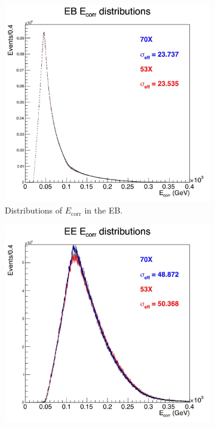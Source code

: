 \documentclass[10pt]{article}
\begin{document}
\begin{figure}[h!]
        \centering
        \begin{subfigure}[b]{0.4\textwidth}
                \includegraphics[width=\textwidth]{fullRunPlots/corrEnergySC_EB_dists}
                \caption{Distributions of $E_{\text{corr}}$ in the EB.}
                \label{distEB}
        \end{subfigure}
        \begin{subfigure}[b]{0.4\textwidth}
                \includegraphics[width=\textwidth]{fullRunPlots/corrEnergySC_EE_dists}

\end{subfigure}
\end{figure}
\end{document}

